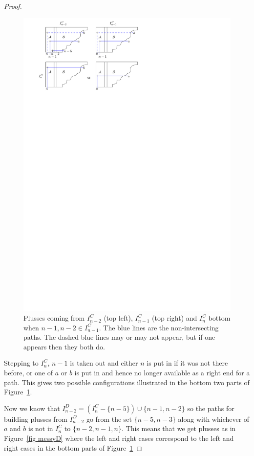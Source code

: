 \documentclass[11pt]{article}
\theoremstyle{remark}
\theoremstyle{definition}
\begin{document}
\begin{proof}
  \begin{figure}
    \includegraphics{messy}
    \caption{Plusses coming from $I_{n-2}^{C}$ (top left),  $I_{n-1}^{C}$ (top right) and $I_{n}^{C}$ bottom when $n-1, n-2\in I_{n-1}^{C}$.  The blue lines are the non-intersecting paths.  The dashed blue lines may or may not appear, but if one appears then they both do.}\label{fig messy}
  \end{figure}

  Stepping to $I_{n}^{C}$, $n-1$ is taken out and either $n$ is put in if it was not there before, or one of $a$ or $b$ is put in and hence no longer available as a right end for a path.  This gives two possible configurations illustrated in the bottom two parts of Figure~\ref{fig messy}.

  Now we know that $I_{n-2}^{D}  = (I_{n}^{C} - \{n-5\})\cup \{n-1,n-2\}$ so the paths for building plusses from $I_{n-2}^{D}$ go from the set $\{n-5, n-3\}$ along with whichever of $a$ and $b$ is not in $I_{n}^{C}$ to $\{n-2, n-1, n\}$.  This means that we get plusses as in Figure~\ref{fig messyD} where the left and right cases correspond to the left and right cases in the bottom parts of Figure~\ref{fig messy}


\end{proof}
\end{document}
